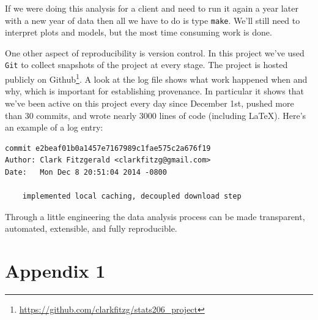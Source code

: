 \documentclass[12pt]{article}
\begin{document}
If we were doing this analysis for a client and need to run it again a year
later with a new year of data 
then all we have to do is type \texttt{make}. We'll still need to interpret
plots and models, but the most time consuming work is done.

One other aspect of reproducibility is version control. In this
project we've used \texttt{Git} to collect snapshots of the project at
every stage. The project is hosted publicly on
Github\footnote{\url{https://github.com/clarkfitzg/stats206\_project}}.
A look at the log file shows what work happened when and why,
which is important for establishing provenance. In particular it shows 
that we've been active on this project every day since
December 1st, pushed more than 30 commits, and wrote nearly 3000 lines of
code (including \LaTeX). Here's an example of a log entry:

\begin{verbatim}
commit e2beaf01b0a1457e7167989c1fae575c2a676f19
Author: Clark Fitzgerald <clarkfitzg@gmail.com>
Date:   Mon Dec 8 20:51:04 2014 -0800

    implemented local caching, decoupled download step
\end{verbatim}

Through a little engineering the data analysis process
can be made transparent, automated, extensible, and fully reproducible.

\section{Appendix 1}


\listoffigures
\end{document}
